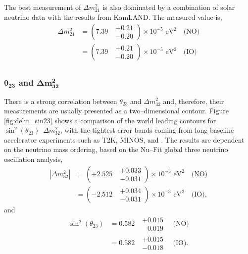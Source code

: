 The best measurement of $\Delta m^2_{21}$ is also dominated by a combination of
solar neutrino data with the results from KamLAND. The measured value is,
\begin{align*}
	\Delta m^2_{21} &= (7.39 \mbox{ } \substack{+ 0.21 \\ - 0.20}) \times 10^{-5} \mbox{  eV}^2 \quad \mbox{(NO)} \\
	                &= (7.39 \mbox{ } \substack{+ 0.21 \\ - 0.20}) \times 10^{-5} \mbox{  eV}^2 \quad \mbox{(IO)} \\
\end{align*}

\subsubsection*{$\boldsymbol{\theta_{23}}$ and $\boldsymbol{\Delta m^2_{32}}$}

There is a strong correlation between $\theta_{23}$ and $\Delta m^2_{32}$ and,
therefore, their measurements are usually presented as a two--dimensional
contour. Figure \ref{fig:delm_sin23} shows a comparison of the world leading
contours for $\sin^2 (\theta_{23})$--$\Delta m^2_{32}$, with the tightest error
bands coming from long baseline accelerator experiments such as T2K, MINOS, and 
\nova{}\cite{PhysRevD.96.092006, PhysRevLett.112.191801, PhysRevLett.123.151803}. 
The results are dependent on the neutrino mass ordering, based on the Nu--Fit 
global three neutrino oscillation analysis\cite{Esteban:2018azc}, 
\begin{align*}
	|\Delta m^2_{32}| &= (+ 2.525 \mbox{ } \substack{+ 0.033 \\ - 0.031}) \times 10^{-3} \mbox{  eV}^2 \quad \mbox{(NO)} \\
	                  &= (- 2.512 \mbox{ } \substack{+ 0.034 \\ - 0.031}) \times 10^{-3} \mbox{  eV}^2 \quad \mbox{(IO)},
\end{align*}
and 
\begin{align*}
	\sin^2(\theta_{23}) &= 0.582 \mbox{  } \substack{+ 0.015 \\ - 0.019} \quad \mbox{(NO)} \nonumber \\
	                    &= 0.582 \mbox{  } \substack{+ 0.015 \\ - 0.018} \quad \mbox{(IO)}.
\end{align*}

